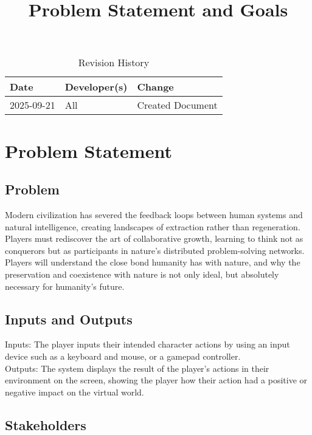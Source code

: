 \documentclass{article}
\title{Problem Statement and Goals\\\progname}
\author{\authname}
\date{}
\begin{document}
\maketitle

\begin{table}[hp]
\caption{Revision History} \label{TblRevisionHistory}
\begin{tabularx}{\textwidth}{llX}
\toprule
\textbf{Date} & \textbf{Developer(s)} & \textbf{Change}\\
\midrule
2025-09-21 & All & Created Document\\
\bottomrule
\end{tabularx}
\end{table}

\section{Problem Statement}

\subsection{Problem}

Modern civilization has severed the feedback loops between human systems and natural intelligence, creating landscapes of extraction rather than regeneration. Players must rediscover the art of collaborative growth, learning to think not as conquerors but as participants in nature's distributed problem-solving networks. Players will understand the close bond humanity has with nature, and why the preservation and coexistence with nature is not only ideal, but absolutely necessary for humanity's future.

\subsection{Inputs and Outputs}

Inputs: The player inputs their intended character actions by using an input device such as a keyboard and mouse, or a gamepad controller.\\
Outputs: The system displays the result of the player’s actions in their environment on the screen, showing the player how their action had a positive or negative impact on the virtual world.

\subsection{Stakeholders}
\end{document}
